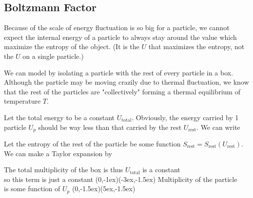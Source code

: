 \documentclass[class=article, crop=false, 12pt]{standalone}
\begin{document}
\subsection{Boltzmann Factor}

Because of the scale of energy fluctuation is so big for a particle,
we cannot expect the internal energy of a particle to always stay around the value which maximize the entropy of the object.
(It is the  $U$ that maximizes the entropy, not the $U$ on a single particle.)
\begin{center}
\end{center}

We can model by isolating a particle with the rest of every particle in a box. 
Although the particle may be moving crazily due to thermal fluctuation, 
we know that the rest of the particles are "collectively" forming a thermal equilibrium of temperature $T$.


Let the total energy to be a constant $U_\text{total}$.
Obviously, the energy carried by 1 particle $U_p$ should be way less than that carried by the rest $U_\text{rest}$.
We can write

Let the entropy of the rest of the particle be some function $S_\text{rest} = S_\text{rest}(U_\text{rest})$.
We can make a Taylor expansion by

The total multiplicity of the box is thus
{\scriptsize $U_\text{total}$ is a constant\\[-1ex]\scriptsize so this term is just a constant}
{(0,-1ex)}{(-3ex,-1.5ex)}
{\scriptsize Multiplicity of the particle\\[-1ex]\scriptsize is some function of $U_p$}
{(0,-1.5ex)}{(5ex,-1.5ex)}
\end{document}
